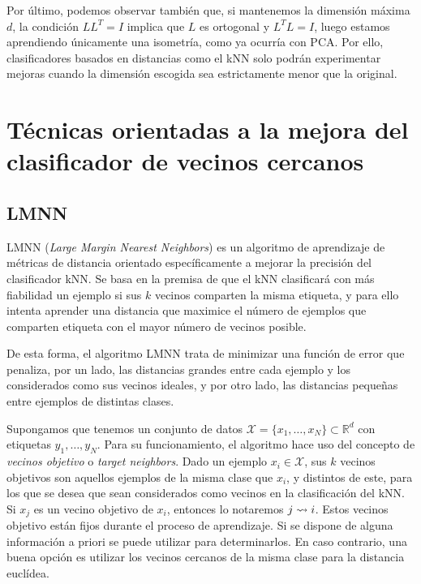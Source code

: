 Por último, podemos observar también que, si mantenemos la dimensión máxima $d$, la condición $LL^T = I$ implica que $L$ es ortogonal y $L^TL=I$, luego estamos aprendiendo únicamente una isometría, como ya ocurría con PCA. Por ello, clasificadores basados en distancias como el kNN solo podrán experimentar mejoras cuando la dimensión escogida sea estrictamente menor que la original.


\section{Técnicas orientadas a la mejora del clasificador de vecinos cercanos}

\subsection{LMNN} \label{section:lmnn}

LMNN (\textit{Large Margin Nearest Neighbors}) \cite{lmnn} es un algoritmo de aprendizaje de métricas de distancia orientado específicamente a mejorar la precisión del clasificador kNN. Se basa en la premisa de que el kNN clasificará con más fiabilidad un ejemplo si sus $k$ vecinos comparten la misma etiqueta, y para ello intenta aprender una distancia que maximice el número de ejemplos que comparten etiqueta con el mayor número de vecinos posible.

De esta forma, el algoritmo LMNN trata de minimizar una función de error que penaliza, por un lado, las distancias grandes entre cada ejemplo y los considerados como sus vecinos ideales, y por otro lado, las distancias pequeñas entre ejemplos de distintas clases.

Supongamos que tenemos un conjunto de datos $\mathcal{X} = \{x_1,\dots,x_N\} \subset \mathbb{R}^d$ con etiquetas $y_1,\dots,y_N$. Para su funcionamiento, el algoritmo hace uso del concepto de \emph{vecinos objetivo} o \emph{target neighbors}. Dado un ejemplo $x_i \in \mathcal{X}$, sus $k$ vecinos objetivos son aquellos ejemplos de la misma clase que $x_i$, y distintos de este, para los que se desea que sean considerados como vecinos en la clasificación del kNN. Si $x_j$ es un vecino objetivo de $x_i$, entonces lo notaremos $j \rightsquigarrow i$. Estos vecinos objetivo están fijos durante el proceso de aprendizaje. Si se dispone de alguna información a priori se puede utilizar para determinarlos. En caso contrario, una buena opción es utilizar los vecinos cercanos de la misma clase para la distancia euclídea.

